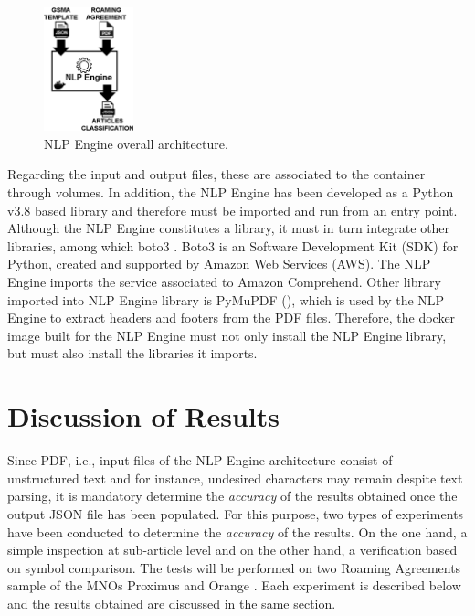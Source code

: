 \documentclass[conference]{style/IEEEtran}
\begin{document}
\begin{figure}[htbp]
\centerline{\includegraphics[width=0.23\textwidth]{images/NLP_Engine.png}}
\caption{NLP Engine overall architecture.}
\label{fig1}
\end{figure}

Regarding the input and output files, these are associated to the container through volumes. In addition, the NLP Engine has been developed as a Python v3.8 based library and therefore must be imported and run from an entry point. Although the NLP Engine constitutes a library, it must in turn integrate other libraries, among which boto3 \cite{boto3}. Boto3 is an Software Development Kit (SDK) for Python, created and supported by Amazon Web Services (AWS). The NLP Engine imports the service associated to Amazon Comprehend. Other library imported into NLP Engine library is PyMuPDF (\cite{PyMuPDF}), which is used by the NLP Engine to extract headers and footers from the PDF files. Therefore, the docker image built for the NLP Engine must not only install the NLP Engine library, but must also install the libraries it imports.

\section{Discussion of Results}
Since PDF, i.e., input files of the NLP Engine architecture consist of unstructured text and for instance, undesired characters may remain despite text parsing, it is mandatory determine the \textit{accuracy} of the results obtained once the output JSON file has been populated. For this purpose, two types of experiments have been conducted to determine the \textit{accuracy} of the results. On the one hand, a simple inspection at sub-article level and on the other hand, a verification based on symbol comparison. The tests will be performed on two Roaming Agreements sample of the MNOs Proximus and Orange \cite{proximus}. Each experiment is described below and the results obtained are discussed in the same section.
\end{document}
